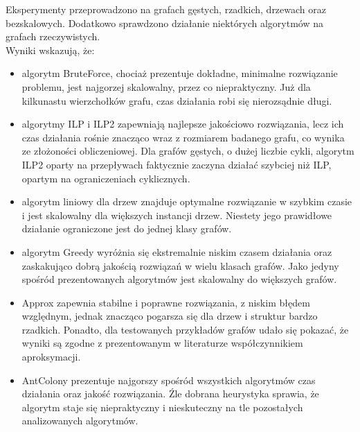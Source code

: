Eksperymenty przeprowadzono na grafach gęstych, rzadkich, drzewach oraz bezskalowych. Dodatkowo sprawdzono działanie niektórych algorytmów na grafach rzeczywistych. \\
Wyniki wskazują, że:
\begin{itemize}
    \item algorytm BruteForce, chociaż prezentuje dokładne, minimalne rozwiązanie problemu, jest najgorzej skalowalny, przez co niepraktyczny. Już dla kilkunastu wierzchołków grafu, czas działania robi się nierozsądnie długi.
    \item algorytmy ILP i ILP2 zapewniają najlepsze jakościowo rozwiązania, lecz ich czas działania rośnie znacząco wraz z rozmiarem badanego grafu, co wynika ze złożoności obliczeniowej. Dla grafów gęstych, o dużej liczbie cykli, algorytm ILP2 oparty na przepływach faktycznie zaczyna działać szybciej niż ILP, opartym na ograniczeniach cyklicznych.
    \item algorytm liniowy dla drzew znajduje optymalne rozwiązanie w szybkim czasie i jest skalowalny dla większych instancji drzew. Niestety jego prawidłowe działanie ograniczone jest do jednej klasy grafów.
    \item algorytm Greedy wyróżnia się ekstremalnie niskim czasem działania oraz zaskakująco dobrą jakością rozwiązań w wielu klasach grafów. Jako jedyny spośród prezentowanych algorytmów jest skalowalny do większych grafów.
    \item Approx zapewnia stabilne i poprawne rozwiązania, z niskim błędem względnym, jednak znacząco pogarsza się dla drzew i struktur bardzo rzadkich. Ponadto, dla testowanych przykładów grafów udało się pokazać, że wyniki są zgodne z prezentowanym w literaturze współczynnikiem aproksymacji.
    \item AntColony prezentuje najgorszy spośród wszystkich algorytmów czas działania oraz jakość rozwiązania. Źle dobrana heurystyka sprawia, że algorytm staje się niepraktyczny i nieskuteczny na tle pozostałych analizowanych algorytmów.
\end{itemize}

